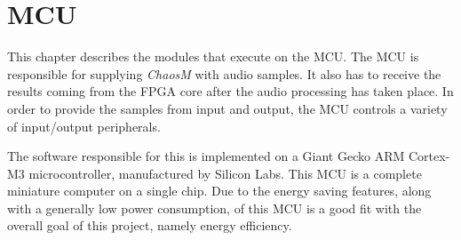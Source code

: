 \clearpage
\section{MCU} \label{section:mcu}

This chapter describes the modules that execute on the MCU. The MCU is
responsible for supplying \textit{ChaosM} with audio samples. It also has to
receive the results coming from the FPGA core after the audio processing has
taken place. In order to provide the samples from input and output, the MCU
controls a variety of input/output peripherals.

The software responsible for this is implemented on a Giant Gecko ARM Cortex-M3
microcontroller, manufactured by Silicon Labs. This MCU is a complete miniature
computer on a single chip. Due to the energy saving features, along with a
generally low power consumption, of this MCU is a good fit with the overall goal
of this project, namely energy efficiency.







